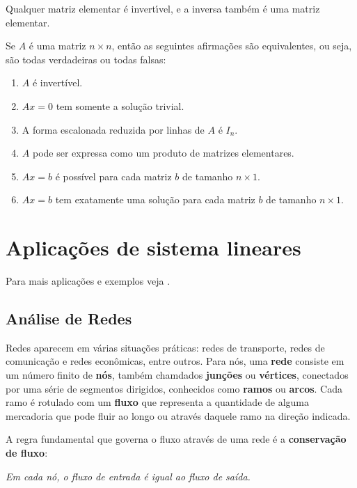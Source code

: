 \begin{teorema}
    Qualquer matriz elementar \'e invert{\'\i}vel, e a inversa tamb\'em \'e uma matriz elementar.
\end{teorema}

\begin{teorema}
    Se $A$ é uma matriz $n \times n$, então as seguintes afirmações são equivalentes, ou seja, são todas verdadeiras ou todas falsas:
    \begin{enumerate}[label={\roman*})]
        \item $A$ é invertível.
        \item $Ax = 0$ tem somente a solução trivial.
        \item A forma escalonada reduzida por linhas de $A$ é $I_n$.
        \item $A$ pode ser expressa como um produto de matrizes elementares.
        \item $Ax = b$ é possível para cada matriz $b$ de tamanho $n \times 1$.
        \item $Ax = b$ tem exatamente uma solução para cada matriz $b$ de tamanho $n \times 1$.
    \end{enumerate}
\end{teorema}

\section{Aplicações de sistema lineares}

Para mais aplicações e exemplos veja \cite{Poole:2016,Anton:2012}.
\subsection{Análise de Redes}

Redes aparecem em várias situações práticas: redes de transporte, redes de comunicação e redes econômicas, entre outros. Para nós, uma \textbf{rede} consiste em um número finito de \textbf{nós}, também chamdados \textbf{junções} ou \textbf{vértices}, conectados por uma série de segmentos dirigidos, conhecidos como \textbf{ramos} ou \textbf{arcos}. Cada ramo é rotulado com um \textbf{fluxo} que representa a quantidade de alguma mercadoria  que pode fluir ao longo ou através daquele ramo na direção indicada.

A regra fundamental que governa o fluxo através de uma rede é a \textbf{conservação de fluxo}:

\begin{tcolorbox}[colback=green!30, colframe=green!80!blue, title=Conservação de fluxo]
    \textit{Em cada nó, o fluxo de entrada é igual ao fluxo de saída.}
\end{tcolorbox}

